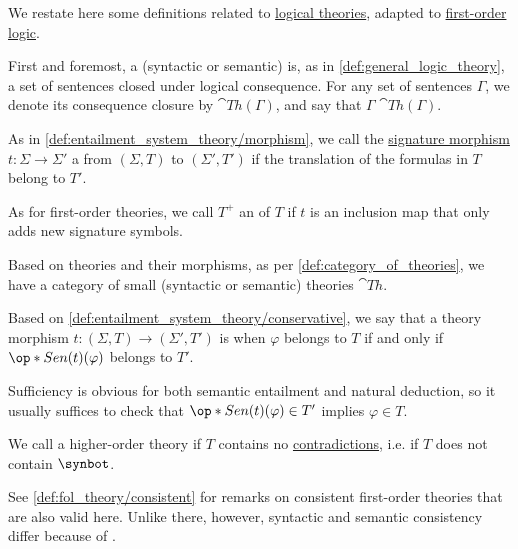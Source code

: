 \begin{definition}\label{def:hol_theory}\mimprovised
  We restate here some definitions related to \hyperref[def:logical_theory]{logical theories}, adapted to \hyperref[def:first_order_logic]{first-order logic}.

  First and foremost, a (syntactic or semantic)  is, as in \cref{def:general_logic_theory}, a set of sentences closed under logical consequence. For any set of sentences \( \Gamma \), we denote its consequence closure by \( \cat{Th}(\Gamma) \), and say that \( \Gamma \)  \( \cat{Th}(\Gamma) \).

  \begin{thmenum}
     As in \cref{def:entailment_system_theory/morphism}, we call the \hyperref[def:hol_signature_category]{signature morphism} \( t: \Sigma \to \Sigma' \) a  from \( (\Sigma, T) \) to \( (\Sigma', T') \) if the translation of the formulas in \( T \) belong to \( T' \).

     As for first-order theories, we call \( T^+ \) an  of \( T \) if \( t \) is an inclusion map that only adds new signature symbols.

     Based on theories and their morphisms, as per \cref{def:category_of_theories}, we have a category of small (syntactic or semantic) theories \( \cat{Th} \).

     Based on \cref{def:entailment_system_theory/conservative}, we say that a theory morphism \( t: (\Sigma, T) \to (\Sigma', T') \) is  when \( \varphi \) belongs to \( T \) if and only if \( \op*{Sen}(t)(\varphi) \) belongs to \( T' \).

    Sufficiency is obvious for both semantic entailment and natural deduction, so it usually suffices to check that \( \op*{Sen}(t)(\varphi) \in T' \) implies \( \varphi \in T \).

     We call a higher-order theory  if \( T \) contains no \hyperref[def:hol_semantics/tautology]{contradictions}, i.e. if \( T \) does not contain \( \synbot \).

    See \cref{def:fol_theory/consistent} for remarks on consistent first-order theories that are also valid here. Unlike there, however, syntactic and semantic consistency differ because of .


\end{thmenum}
\end{definition}
